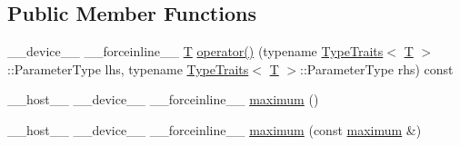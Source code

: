 \subsection*{Public Member Functions}
\begin{DoxyCompactItemize}
\item 
\-\_\-\-\_\-device\-\_\-\-\_\- \-\_\-\-\_\-forceinline\-\_\-\-\_\- \hyperlink{calib3d_8hpp_a3efb9551a871ddd0463079a808916717}{T} \hyperlink{structcv_1_1gpu_1_1device_1_1maximum_a69ab416d4bac9ec57cec6810e4358c13}{operator()} (typename \hyperlink{structcv_1_1gpu_1_1device_1_1TypeTraits}{Type\-Traits}$<$ \hyperlink{calib3d_8hpp_a3efb9551a871ddd0463079a808916717}{T} $>$\-::Parameter\-Type lhs, typename \hyperlink{structcv_1_1gpu_1_1device_1_1TypeTraits}{Type\-Traits}$<$ \hyperlink{calib3d_8hpp_a3efb9551a871ddd0463079a808916717}{T} $>$\-::Parameter\-Type rhs) const 
\item 
\-\_\-\-\_\-host\-\_\-\-\_\- \-\_\-\-\_\-device\-\_\-\-\_\- \-\_\-\-\_\-forceinline\-\_\-\-\_\- \hyperlink{structcv_1_1gpu_1_1device_1_1maximum_a4c83331c95aed7fb02b2d4f079adb8e6}{maximum} ()
\item 
\-\_\-\-\_\-host\-\_\-\-\_\- \-\_\-\-\_\-device\-\_\-\-\_\- \-\_\-\-\_\-forceinline\-\_\-\-\_\- \hyperlink{structcv_1_1gpu_1_1device_1_1maximum_a2a601ebc3fbe3f3ca95d3cc931487f1f}{maximum} (const \hyperlink{structcv_1_1gpu_1_1device_1_1maximum}{maximum} \&)
\end{DoxyCompactItemize}


